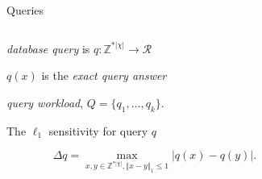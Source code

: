 \begin{frame}{Queries}
\begin{columns}[T] %
\begin{column}{.58\textwidth}
  \begin{wideitemize}
	  \item \emph{database query} is $q:\mathbb{Z}^{\ast |\chi |}\rightarrow \mathcal{R}$
	  \item $q(x)$ is the \emph{exact query answer}
	  \item \emph{query workload}, $Q=\{q_{1},\ldots,q_{k} \}$.
	  \item The $\ell_{1}$ sensitivity for query $q$ 
		\begin{definition}
			\label{def:query_sensitivity}
			\begin{equation*}
				\Delta q = \max_{x,y\in \mathbb{Z}^{\ast |\chi |}, \left\Vert{x}-{y}\right\Vert_{1} \le 1}|q(x)-q(y)|.
			\end{equation*}
		\end{definition}
  \end{wideitemize}
\end{column}%
\hfill%
\begin{column}{.38\textwidth}
\end{column}%
\end{columns}
\end{frame}

